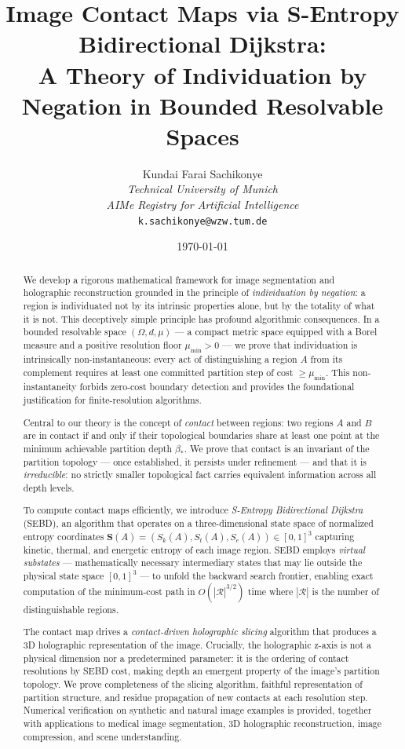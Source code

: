 \documentclass[twocolumn]{article}
\title{Image Contact Maps via S-Entropy Bidirectional Dijkstra:\\
A Theory of Individuation by Negation in Bounded Resolvable Spaces}
\author{Kundai Farai Sachikonye\\
\textit{Technical University of Munich}\\
\textit{AIMe Registry for Artificial Intelligence}\\
\texttt{k.sachikonye@wzw.tum.de}}
\date{\today}
\theoremstyle{plain}
\theoremstyle{definition}
\newcommand{\Sk}{S_k}
\newcommand{\St}{S_t}
\newcommand{\Se}{S_e}
\newcommand{\bS}{\mathbf{S}}
\newcommand{\bstar}{\beta_*}
\newcommand{\mumin}{\mu_{\min}}
\begin{document}
\maketitle

\begin{abstract}
We develop a rigorous mathematical framework for image segmentation and
holographic reconstruction grounded in the principle of \emph{individuation by
negation}: a region is individuated not by its intrinsic properties alone, but
by the totality of what it is not. This deceptively simple principle has
profound algorithmic consequences. In a bounded resolvable space
$(\Omega, d, \mu)$ --- a compact metric space equipped with a Borel measure and
a positive resolution floor $\mumin > 0$ --- we prove that individuation is
intrinsically non-instantaneous: every act of distinguishing a region $A$ from
its complement requires at least one committed partition step of cost $\geq
\mumin$. This non-instantaneity forbids zero-cost boundary detection and
provides the foundational justification for finite-resolution algorithms.

Central to our theory is the concept of \emph{contact} between regions: two
regions $A$ and $B$ are in contact if and only if their topological boundaries
share at least one point at the minimum achievable partition depth $\bstar$.
We prove that contact is an invariant of the partition topology --- once
established, it persists under refinement --- and that it is \emph{irreducible}:
no strictly smaller topological fact carries equivalent information across all
depth levels.

To compute contact maps efficiently, we introduce \emph{S-Entropy Bidirectional
Dijkstra} (SEBD), an algorithm that operates on a three-dimensional state space
of normalized entropy coordinates $\bS(A) = (\Sk(A), \St(A), \Se(A)) \in
[0,1]^3$ capturing kinetic, thermal, and energetic entropy of each image region.
SEBD employs \emph{virtual substates} --- mathematically necessary intermediary
states that may lie outside the physical state space $[0,1]^3$ --- to unfold
the backward search frontier, enabling exact computation of the minimum-cost
path in $O(|\mathcal{R}|^{3/2})$ time where $|\mathcal{R}|$ is the number of
distinguishable regions.

The contact map drives a \emph{contact-driven holographic slicing} algorithm
that produces a 3D holographic representation of the image. Crucially, the
holographic z-axis is not a physical dimension nor a predetermined parameter: it
is the ordering of contact resolutions by SEBD cost, making depth an emergent
property of the image's partition topology. We prove completeness of the slicing
algorithm, faithful representation of partition structure, and residue
propagation of new contacts at each resolution step. Numerical verification on
synthetic and natural image examples is provided, together with applications to
medical image segmentation, 3D holographic reconstruction, image compression,
and scene understanding.
\end{abstract}
\end{document}
